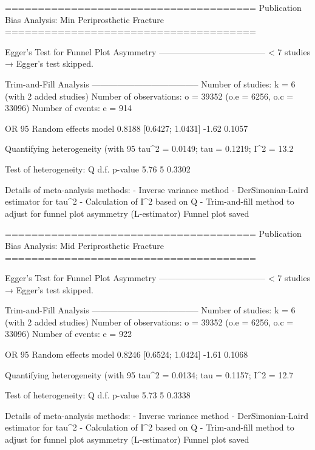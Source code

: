 ======================================
Publication Bias Analysis: Min Periprosthetic Fracture 
======================================
                                                                                                                                                          
Egger's Test for Funnel Plot Asymmetry
--------------------------------------
  < 7 studies → Egger’s test skipped.

Trim-and-Fill Analysis
--------------------------------------
Number of studies: k = 6 (with 2 added studies)
Number of observations: o = 39352 (o.e = 6256, o.c = 33096)
Number of events: e = 914

                         OR           95%
Random effects model 0.8188 [0.6427; 1.0431] -1.62  0.1057

Quantifying heterogeneity (with 95%
 tau^2 = 0.0149; tau = 0.1219; I^2 = 13.2%

Test of heterogeneity:
    Q d.f. p-value
 5.76    5  0.3302

Details of meta-analysis methods:
- Inverse variance method
- DerSimonian-Laird estimator for tau^2
- Calculation of I^2 based on Q
- Trim-and-fill method to adjust for funnel plot asymmetry (L-estimator)
  Funnel plot saved

======================================
Publication Bias Analysis: Mid Periprosthetic Fracture 
======================================
                                                                                                                                                          
Egger's Test for Funnel Plot Asymmetry
--------------------------------------
  < 7 studies → Egger’s test skipped.

Trim-and-Fill Analysis
--------------------------------------
Number of studies: k = 6 (with 2 added studies)
Number of observations: o = 39352 (o.e = 6256, o.c = 33096)
Number of events: e = 922

                         OR           95%
Random effects model 0.8246 [0.6524; 1.0424] -1.61  0.1068

Quantifying heterogeneity (with 95%
 tau^2 = 0.0134; tau = 0.1157; I^2 = 12.7%

Test of heterogeneity:
    Q d.f. p-value
 5.73    5  0.3338

Details of meta-analysis methods:
- Inverse variance method
- DerSimonian-Laird estimator for tau^2
- Calculation of I^2 based on Q
- Trim-and-fill method to adjust for funnel plot asymmetry (L-estimator)
  Funnel plot saved

